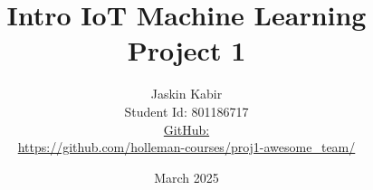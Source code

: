 \centering

\title{\Huge Intro IoT Machine Learning Project 1}

\author{ \huge
Jaskin Kabir \\
\Large Student Id: 801186717 \\
\Large \href{https://github.com/holleman-courses/proj1-awesome_team/}{GitHub:}\\\url{https://github.com/holleman-courses/proj1-awesome_team/}
}

\date{March 2025}

\begin{titlingpage}
\maketitle
\end{titlingpage}